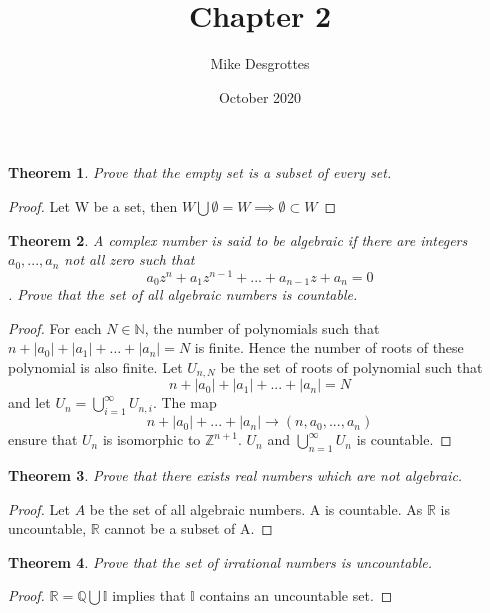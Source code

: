 \documentclass{article}
\title{Chapter 2}
\author{Mike Desgrottes}
\date{October 2020}
\theoremstyle{plain}
\newtheorem{theorem}{Theorem}
\theoremstyle{definition}
\begin{document}
\maketitle

\begin{theorem}
	Prove that the empty set is a subset of every set.
\end{theorem}

\begin{proof}
	Let W be a set, then $W \bigcup \emptyset = W \implies \emptyset \subset W$
\end{proof}

\begin{theorem}
	A complex number is said to be algebraic if there are integers $a_{0},...,a_{n}$ not all zero such that $$a_{0}z^{n} + a_{1}z^{n - 1} + ... + a_{n - 1}z + a_{n} = 0 $$. Prove that the set of all algebraic numbers is countable.
\end{theorem}

\begin{proof}
	For each $N \in \mathbb{N}$, the number of polynomials such that $n + |a_{0}| + |a_{1}| + ... + |a_{n}| = N$ is finite. Hence the number of roots of these polynomial is also finite. Let $U_{n,N}$ be the set of roots of polynomial such that $$n + |a_{0}| + |a_{1}| + ... + |a_{n}| = N $$ and let $U_{n} = \bigcup_{i = 1}^{\infty} U_{n,i}$. The map $$n + |a_{0}| + ... + |a_{n}| \to (n,a_{0},...,a_{n}) $$ ensure that $U_{n}$ is isomorphic to $\mathbb{Z}^{n + 1}$. $U_{n}$ and $\bigcup_{n = 1}^{\infty} U_{n}$ is countable.
\end{proof}

\begin{theorem}
	Prove that there exists real numbers which are not algebraic.
\end{theorem}

\begin{proof}
	Let $A$ be the set of all algebraic numbers. A is countable. As $\mathbb{R}$ is uncountable, $\mathbb{R}$ cannot be a subset of A.
\end{proof}

\begin{theorem}
	Prove that the set of irrational numbers is uncountable.
\end{theorem}

\begin{proof}
	$\mathbb{R} = \mathbb{Q} \bigcup \mathbb{I}$ implies that $\mathbb{I}$ contains an uncountable set.
\end{proof}
\end{document}
